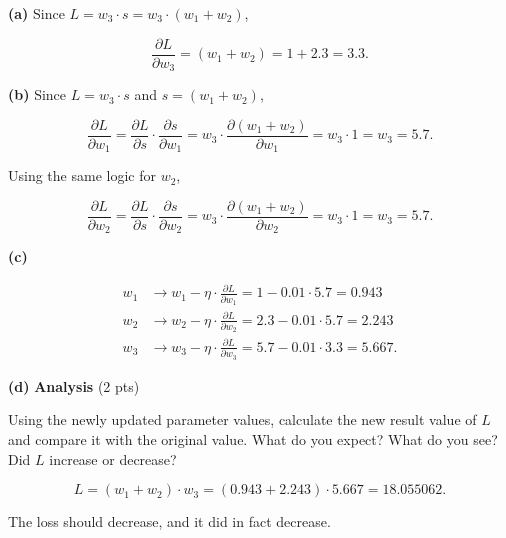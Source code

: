 \begin{solution*}{}{}
\textbf{(a)} Since $L = w_3 \cdot s = w_3 \cdot (w_1 + w_2)$,

\[
\frac{\partial L}{\partial w_3} = (w_1 + w_2) = 1 + 2.3 = 3.3
.\] 

\textbf{(b)} Since $L = w_3 \cdot s$ and $s = (w_1 + w_2)$,

\[
\frac{\partial L}{\partial w_1} = 
\frac{\partial L}{\partial s} \cdot \frac{\partial s}{\partial w_1}  = 
w_3 \cdot \frac{\partial (w_1 + w_2)}{\partial w_1} = 
w_3 \cdot 1 = w_3 = 5.7
.\] 

Using the same logic for $w_2$,

\[
\frac{\partial L}{\partial w_2} = 
\frac{\partial L}{\partial s} \cdot \frac{\partial s}{\partial w_2}  = 
w_3 \cdot \frac{\partial (w_1 + w_2)}{\partial w_2} = 
w_3 \cdot 1 = w_3 = 5.7
.\] 
\vspace{5px}

\textbf{(c)} 

\begin{align*}
    w_1 &\to w_1 - \eta \cdot \frac{\partial L}{\partial w_1} = 1 - 0.01 \cdot
    5.7 = 0.943 \\ 
    w_2 &\to  w_2 - \eta \cdot \frac{\partial L}{\partial w_2} = 2.3 - 0.01 \cdot
    5.7 = 2.243 \\ 
    w_3 &\to w_3 - \eta \cdot \frac{\partial L}{\partial w_3}  = 5.7 - 0.01 \cdot
    3.3 = 5.667
.\end{align*}

\textbf{(d)} \textbf{Analysis} \hfill (2 pts)
\begin{adjustwidth}{2em}{2em}
Using the newly updated parameter values, calculate the new result value
of $L$ and compare it with the original value. What do you expect? What
do you see? Did $L$ increase or decrease?
\end{adjustwidth}

\[
L = (w_1 + w_2) \cdot w_3 = (0.943 + 2.243) \cdot 5.667 = 18.055062
.\] 

The loss should decrease, and it did in fact decrease.
\end{solution*}
